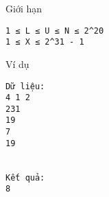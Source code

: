 Giới hạn  
\begin{verbatim}
1 ≤ L ≤ U ≤ N ≤ 2^20
1 ≤ X ≤ 2^31 - 1
\end{verbatim}
   Ví dụ  
\begin{verbatim}
Dữ liệu:
4 1 2
231
19
7
19


Kết quả:
8
\end{verbatim}